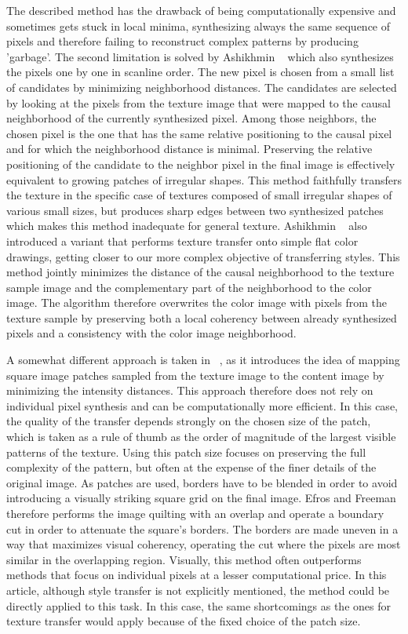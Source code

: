 \documentclass[a4paper]{article}
\begin{document}
The described method has the drawback of being computationally expensive and sometimes gets stuck in local minima, synthesizing always the same sequence of pixels and therefore failing to reconstruct complex patterns by producing 'garbage'.
The second limitation is solved by Ashikhmin ~\cite{natural-textures} which also synthesizes the pixels one by one in scanline order. The new pixel is chosen from a small list of candidates by minimizing neighborhood distances. The candidates are selected by looking at the pixels from the texture image that were mapped to the causal neighborhood of the currently synthesized pixel. Among those neighbors, the chosen pixel is the one that has the same relative positioning to the causal pixel and for which the neighborhood distance is minimal. Preserving the relative positioning of the candidate to the neighbor pixel in the final image is effectively equivalent to growing patches of irregular shapes. This method faithfully transfers the texture in the specific case of textures composed of small irregular shapes of various small sizes, but produces sharp edges between two synthesized patches which makes this method inadequate for general texture.  Ashikhmin ~\cite{fasttransfer} also introduced a variant that performs texture transfer onto simple flat color drawings, getting closer to our more complex objective of transferring styles. This method jointly minimizes the distance of the causal neighborhood to the texture sample image and the complementary part of the neighborhood to the color image. The algorithm therefore overwrites the color image with pixels from the texture sample by preserving both a local coherency between already synthesized pixels and a consistency with the color image neighborhood.

A somewhat different approach is taken in  ~\cite{quilting}, as it introduces the idea of mapping square image patches sampled from the texture image to the content image by minimizing the intensity distances. This approach therefore does not rely on individual pixel synthesis and can be computationally more efficient. In this case, the quality of the transfer depends strongly on the chosen size of the patch, which is taken as a rule of thumb as the order of magnitude of the largest visible patterns of the texture. Using this patch size focuses on preserving the full complexity of the pattern, but often at the expense of the finer details of the original image. 
As patches are used, borders have to be blended in order to avoid introducing a visually striking square grid on the final image. Efros and Freeman \cite{quilting} therefore performs the image quilting with an overlap and operate a boundary cut in order to attenuate the square's borders. The borders are made uneven in a way that maximizes visual coherency, operating the cut where the pixels are most similar in the overlapping region.
Visually, this method often outperforms methods that focus on individual pixels at a lesser computational price.
In this article, although style transfer is not explicitly mentioned, the method could be directly applied to this task. In this case, the same shortcomings as the ones for texture transfer would apply because of the fixed choice of the patch size.
\end{document}
